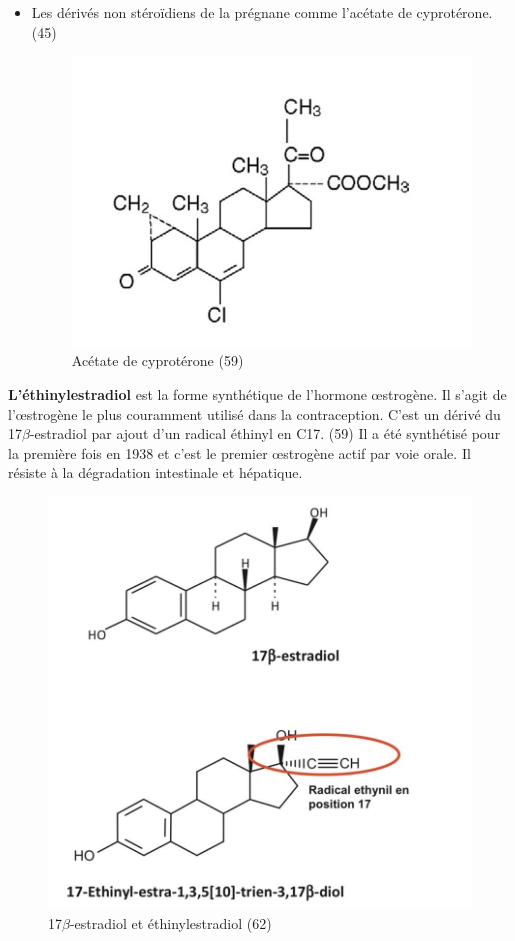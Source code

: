 \begin{itemize}[label={$\bullet$}, align=right]
  \item Les dérivés non stéroïdiens de la prégnane comme l’acétate de cyprotérone. (45) 
  \begin{figure}[H]
    \centering
    \includegraphics{Images/fig_35.jpg}
    \caption{Acétate de cyprotérone (59)}
    
  \end{figure}
  
\end{itemize}

\noindent \textbf{L’éthinylestradiol} est la forme synthétique de l’hormone œstrogène. Il s’agit de l’œstrogène le plus couramment utilisé dans la contraception. C’est un dérivé du 17$\beta$-estradiol par ajout d’un radical éthinyl en C17. (59) Il a été synthétisé pour la première fois en 1938 et c’est le premier œstrogène actif par voie orale. Il résiste à la dégradation intestinale et hépatique.  

\begin{figure}[H]
  \centering
  \includegraphics[scale=.6]{Images/fig_36.jpg}
  \caption{17$\beta$-estradiol et éthinylestradiol (62)}
\end{figure}

